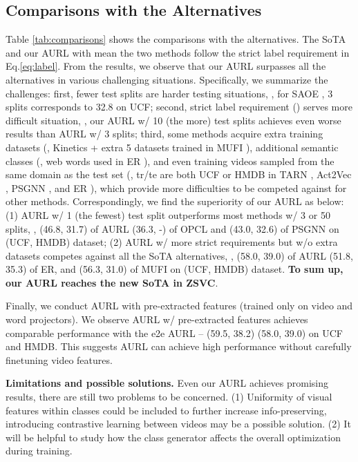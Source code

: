 \documentclass[10pt,twocolumn,letterpaper]{article}
\begin{document}
\subsection{Comparisons with the Alternatives}
Table \ref{tab:comparisons} shows the comparisons with the alternatives.
The SoTA \cite{brattoli2020rethinking} and our AURL with  mean the two methods follow the strict label requirement in Eq.\ref{eq:label}.
From the results, we observe that our AURL surpasses all the alternatives in various challenging situations.
Specifically, we summarize the challenges:
first, fewer test splits are harder testing situations, \eg, for SAOE \cite{mettes2017spatial}, 3  splits corresponds to 32.8  on UCF;
second, strict label requirement () serves more difficult situation, \eg, our AURL w/ 10 (the more) test splits achieves even worse results than AURL w/ 3 splits;
third, some methods acquire extra training datasets (\eg, Kinetics + extra 5 datasets trained in MUFI \cite{qiu2021boosting}), additional semantic classes (\eg, web words used in ER \cite{chen2021elaborative} ), and even training videos sampled from the same domain as the test set (\eg, tr/te are both UCF or HMDB in TARN \cite{bishay2019tarn}, Act2Vec \cite{hahn2019action2vec}, PSGNN \cite{gao2020learning}, and ER \cite{chen2021elaborative}), which provide more difficulties to be competed against for other methods.
Correspondingly, we find the superiority of our AURL as below:
(1) AURL w/ 1 (the fewest) test split outperforms most methods w/ 3 or 50 splits, \eg, (46.8, 31.7) of AURL \vs (36.3, -) of OPCL and (43.0, 32.6) of PSGNN on (UCF, HMDB) dataset;
(2) AURL w/ more strict requirements but w/o extra datasets competes against all the SoTA alternatives, \eg, (58.0, 39.0) of AURL \vs (51.8, 35.3) of ER, and (56.3, 31.0) of MUFI on (UCF, HMDB) dataset.
{\bf To sum up, our AURL reaches the new SoTA in ZSVC}.

Finally, we conduct AURL with pre-extracted features (trained only on video and word projectors).
We observe AURL w/ pre-extracted features achieves comparable performance with the e2e AURL -- (59.5, 38.2) \vs (58.0, 39.0) on UCF and HMDB.
This suggests AURL can achieve high performance without carefully finetuning video features.

{\bf Limitations and possible solutions.}
Even our AURL achieves promising results, there are still two problems to be concerned.
(1) Uniformity of visual features within classes could be included to further increase info-preserving, introducing contrastive learning between videos may be a possible solution.
(2) It will be helpful to study how the class generator affects the overall optimization during training. 
\end{document}
